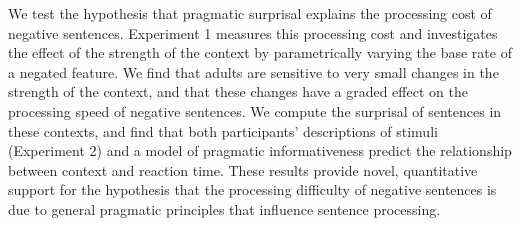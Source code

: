 \documentclass[man]{apa2}
\begin{document}
We test the hypothesis that pragmatic surprisal explains the processing cost of negative sentences. Experiment 1 measures this processing cost and investigates the effect of the strength of the context by parametrically varying the base rate of a negated feature. We find that adults are sensitive to very small changes in the strength of the context, and that these changes have a graded effect on the processing speed of negative sentences.  We compute the surprisal of sentences in these contexts, and find that both participants' descriptions of stimuli (Experiment 2) and a model of pragmatic informativeness predict the relationship between context and reaction time.  These results provide novel, quantitative support for the hypothesis that the processing difficulty of negative sentences is due to general pragmatic principles that influence sentence processing.
%
%
%
%
%
%
\end{document}
